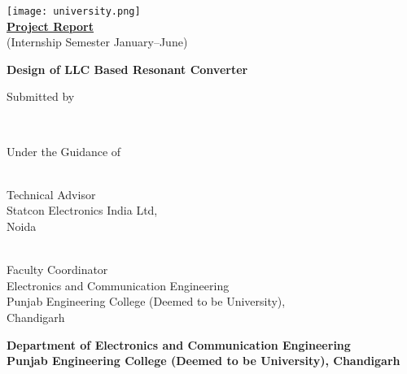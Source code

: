 \begin{titlepage}
    \begin{center}

        
        \texttt{[image: university.png]}\\
        {\href{https://thesoumilarora.github.io/Internship-Project-Report/main.pdf}{\textbf{Project Report}}}\\
        \vspace*{0.2cm}
        (Internship Semester January--June)

        \vspace*{3cm}
        {\Large\textbf {Design of LLC Based Resonant Converter}}

        \vfill
        Submitted by

        \vfill
        \textbf{
        \name \\
        \sid
        }

        \vfill
        Under the Guidance of
    \end{center}
    \vfill

    \noindent
    
    \begin{minipage}[t]{0.4\textwidth}
        \raggedright
        \industry \\
        Technical Advisor\\
        Statcon Electronics India Ltd,\\
        Noida
    \end{minipage}
    \hfill
    \begin{minipage}[t]{0.55\textwidth}
        \raggedleft
        \faculty \\
        Faculty Coordinator\\
        Electronics and Communication Engineering\\
        Punjab Engineering College (Deemed to be University),\\
        Chandigarh
    \end{minipage}
    \begin{center}
        \vfill
        \textbf{Department of Electronics and Communication Engineering}\\
        \textbf{Punjab Engineering College (Deemed to be University), Chandigarh}\\
    \end{center}
\end{titlepage}